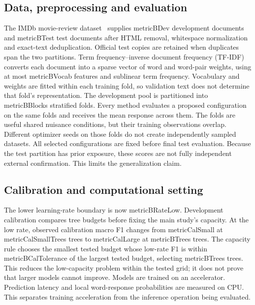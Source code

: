 \documentclass[12pt,a4paper]{article}
\newcommand{\m}[1]{\csname metric#1\endcsname}
\begin{document}
\subsection{Data, preprocessing and evaluation}
The IMDb movie-review dataset~\cite{imdb} supplies \m{BDev} development documents and \m{BTest} test documents after HTML removal, whitespace normalization and exact-text deduplication. Official test copies are retained when duplicates span the two partitions. Term frequency--inverse document frequency (TF-IDF) converts each document into a sparse vector of word and word-pair weights, using at most \m{BVocab} features and sublinear term frequency. Vocabulary and weights are fitted within each training fold, so validation text does not determine that fold's representation.
The development pool is partitioned into \m{BBlocks} stratified folds. Every method evaluates a proposed configuration on the same folds and receives the mean response across them. The folds are useful shared nuisance conditions, but their training observations overlap. Different optimizer seeds on those folds do not create independently sampled datasets.
All selected configurations are fixed before final test evaluation. Because the test partition has prior exposure, these scores are not fully independent external confirmation. This limits the generalization claim.
\subsection{Calibration and computational setting}
The lower learning-rate boundary is now \m{BRateLow}. Development calibration compares tree budgets before fixing the main study's capacity. At the low rate, observed calibration macro F1 changes from \m{CalSmall} at \m{CalSmallTrees} trees to \m{CalLarge} at \m{BTrees} trees. The capacity rule chooses the smallest tested budget whose low-rate F1 is within \m{BCalTolerance} of the largest tested budget, selecting \m{BTrees} trees. This reduces the low-capacity problem within the tested grid; it does not prove that larger models cannot improve.
Models are trained on an \AcceleratorName{} accelerator. Prediction latency and local word-response probabilities are measured on CPU. This separates training acceleration from the inference operation being evaluated.
\begin{table}[!htbp]\centering\small
\caption{Phase B development calibration. Tree count is selected before the main study; accuracy and timing change with capacity. The timings are calibration observations, not final-model serving guarantees.}\end{table}
\end{document}
